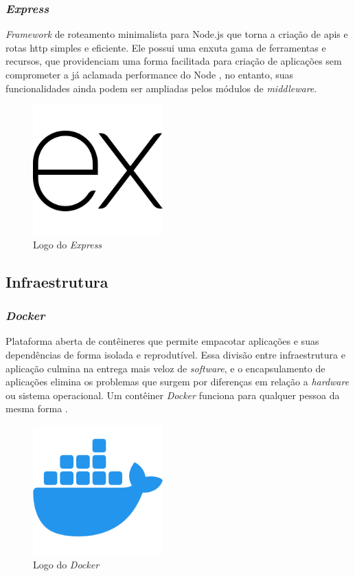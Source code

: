 \subsubsection{\emph{Express}} 
\emph{Framework} de roteamento minimalista para Node.js que torna a criação de \gls{api}s e rotas \gls{http} simples e eficiente. Ele possui uma enxuta gama de ferramentas e recursos, que providenciam uma forma facilitada para criação de aplicações sem comprometer a já aclamada performance do Node \cite{express}, no entanto, suas funcionalidades ainda podem ser ampliadas pelos módulos de \emph{middleware}.

\begin{figure}[htb]
	\centering
	\includegraphics[width=5cm]{cap04-desenvolvimento/images/4-4-2-2-express-logo.png}
	\caption{Logo do \emph{Express}}
	\label{fig:express-logo}
\end{figure}
\FloatBarrier

\subsection{Infraestrutura} 

\subsubsection{\emph{Docker}}
Plataforma aberta de contêineres que permite empacotar aplicações e suas dependências de forma isolada e reprodutível. Essa divisão entre infraestrutura e aplicação culmina na entrega mais veloz de \emph{software}, e o encapsulamento de aplicações elimina os problemas que surgem por diferenças em relação a \emph{hardware} ou sistema operacional. Um contêiner \emph{Docker} funciona para qualquer pessoa da mesma forma \cite{docker}.

\begin{figure}[htb]
	\centering
	\includegraphics[width=5cm]{cap04-desenvolvimento/images/4-4-3-1-docker-logo.png}
	\caption{Logo do \emph{Docker}}
	\label{fig:docker-logo}
\end{figure}
\FloatBarrier

